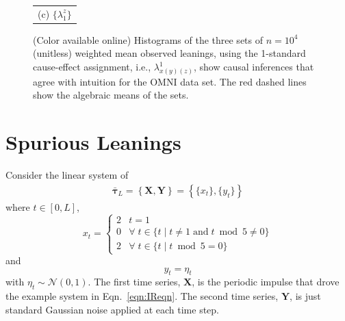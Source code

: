 \documentclass[a4paper,11pt,twocolumn]{article}
\begin{document}
\begin{figure}[ht]
\begin{tabular}{cc}
\multicolumn{2}{c}{(c) $\{\lambda_1^{z}\}$}\\
\end{tabular}
\caption{(Color available online) Histograms of the three sets of $n=10^4$ (unitless) weighted mean observed leanings, using the 1-standard cause-effect assignment, i.e., $\lambda^1_{x(y)(z)}$, show causal inferences that agree with intuition for the OMNI data set.  The red dashed lines show the algebraic means of the sets.}
\label{fig:dsthist}
\end{figure}

\section{Spurious Leanings}
Consider the linear system of
\begin{eqnarray}
\label{eqn:Spur}
\bar{\mathbf{\tau}}_L = \left\{\mathbf{X},\mathbf{Y}\right\} = \left\{\{x_t\},\{y_t\}\right\}
\end{eqnarray}
where $t\in[0,L]$,
\begin{equation*}
x_t = \left\{
  \begin{array}{lr}
    2 & t = 1\\
    0 & \forall\; t\in\{t\;|\;t\neq 1 \;\mathrm{and}\; t\bmod 5 \neq 0\}\\
    2 & \forall\; t\in\{t\;|\;t\bmod 5 = 0\}
  \end{array}
\right.
\end{equation*}
and
\begin{equation*}
y_t = \eta_t
\end{equation*}
with $\eta_t\sim\mathcal{N}\left(0,1\right)$.  The first time series, $\mathbf{X}$, is the periodic impulse that drove the example system in Eqn.\ \ref{eqn:IReqn}.  The second time series, $\mathbf{Y}$, is just standard Gaussian noise applied at each time step.  
\end{document}
